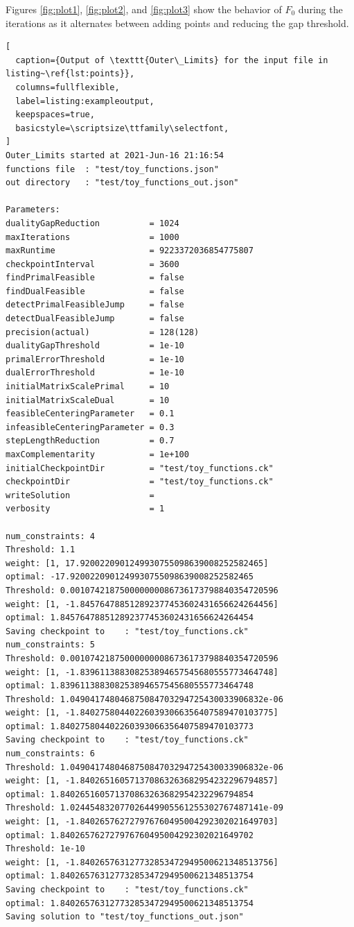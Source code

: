 \documentclass[12pt]{article}
\numberwithin{equation}{section}
\begin{document}
Figures \ref{fig:plot1}, \ref{fig:plot2}, and
\ref{fig:plot3} show the behavior of $F_0$ during the iterations
as it alternates between adding points and reducing the gap threshold.

\begin{lstlisting}[
  caption={Output of \texttt{Outer\_Limits} for the input file in listing~\ref{lst:points}},
  columns=fullflexible,
  label=listing:exampleoutput,
  keepspaces=true,
  basicstyle=\scriptsize\ttfamily\selectfont,
]
Outer_Limits started at 2021-Jun-16 21:16:54
functions file  : "test/toy_functions.json"
out directory   : "test/toy_functions_out.json"

Parameters:
dualityGapReduction          = 1024
maxIterations                = 1000
maxRuntime                   = 9223372036854775807
checkpointInterval           = 3600
findPrimalFeasible           = false
findDualFeasible             = false
detectPrimalFeasibleJump     = false
detectDualFeasibleJump       = false
precision(actual)            = 128(128)
dualityGapThreshold          = 1e-10
primalErrorThreshold         = 1e-10
dualErrorThreshold           = 1e-10
initialMatrixScalePrimal     = 10
initialMatrixScaleDual       = 10
feasibleCenteringParameter   = 0.1
infeasibleCenteringParameter = 0.3
stepLengthReduction          = 0.7
maxComplementarity           = 1e+100
initialCheckpointDir         = "test/toy_functions.ck"
checkpointDir                = "test/toy_functions.ck"
writeSolution                = 
verbosity                    = 1

num_constraints: 4
Threshold: 1.1
weight: [1, 17.9200220901249930755098639008252582465]
optimal: -17.9200220901249930755098639008252582465
Threshold: 0.001074218750000000086736173798840354720596
weight: [1, -1.845764788512892377453602431656624264456]
optimal: 1.845764788512892377453602431656624264454
Saving checkpoint to    : "test/toy_functions.ck"
num_constraints: 5
Threshold: 0.001074218750000000086736173798840354720596
weight: [1, -1.839611388308253894657545680555773464748]
optimal: 1.839611388308253894657545680555773464748
Threshold: 1.049041748046875084703294725430033906832e-06
weight: [1, -1.840275804402260393066356407589470103775]
optimal: 1.840275804402260393066356407589470103773
Saving checkpoint to    : "test/toy_functions.ck"
num_constraints: 6
Threshold: 1.049041748046875084703294725430033906832e-06
weight: [1, -1.840265160571370863263682954232296794857]
optimal: 1.840265160571370863263682954232296794854
Threshold: 1.024454832077026449905561255302767487141e-09
weight: [1, -1.840265762727976760495004292302021649703]
optimal: 1.840265762727976760495004292302021649702
Threshold: 1e-10
weight: [1, -1.840265763127732853472949500621348513756]
optimal: 1.840265763127732853472949500621348513754
Saving checkpoint to    : "test/toy_functions.ck"
optimal: 1.840265763127732853472949500621348513754
Saving solution to "test/toy_functions_out.json"
\end{lstlisting}
\end{document}
